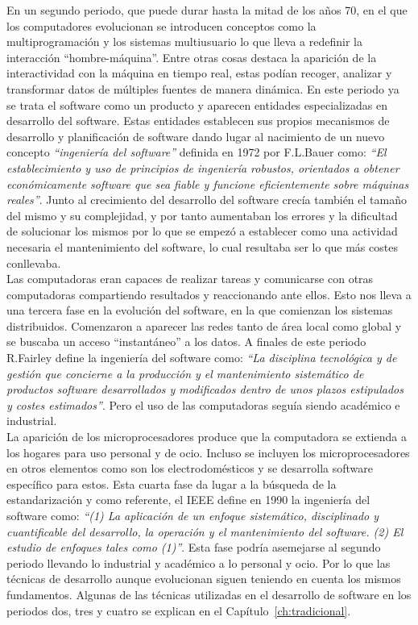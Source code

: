 En un segundo periodo, que puede durar hasta la mitad de los años 70,
en el que los computadores evolucionan se introducen conceptos como la
multiprogramación y los sistemas multiusuario lo que lleva a redefinir
la interacción ``hombre-máquina''. Entre otras cosas destaca la
aparición de la interactividad con la máquina en tiempo real, estas
podían recoger, analizar y transformar datos de múltiples fuentes de
manera dinámica. En este periodo ya se trata el software como un
producto y aparecen entidades especializadas en desarrollo del
software. Estas entidades establecen sus propios mecanismos de
desarrollo y planificación de software dando lugar al nacimiento de un
nuevo concepto \emph{``ingenier\'ia del software''} definida en 1972 por
F.L.Bauer como: \emph{``El establecimiento y uso de principios de ingeniería
robustos, orientados a obtener económicamente software que sea fiable
y funcione eficientemente sobre máquinas reales''}. Junto al crecimiento
del desarrollo del software crecía también el tamaño del mismo y su
complejidad, y por tanto aumentaban los errores y la dificultad de
solucionar los mismos por lo que se empezó a establecer como una
actividad necesaria el mantenimiento del software, lo cual resultaba
ser lo que más costes conllevaba.\\

Las computadoras eran capaces de realizar tareas y comunicarse con
otras computadoras compartiendo resultados y reaccionando ante
ellos. Esto nos lleva a una tercera fase en la evolución del software,
en la que comienzan los sistemas distribuidos. Comenzaron a aparecer
las redes tanto de área local como global y se buscaba un acceso
``instantáneo'' a los datos. A finales de este periodo R.Fairley define
la ingeniería del software como: \emph{``La disciplina tecnológica y de
gestión que concierne a la producción y el mantenimiento sistemático
de productos software desarrollados y modificados dentro de unos
plazos estipulados y costes estimados''}. Pero el uso de las
computadoras seguía siendo académico e industrial.\\

La aparición de los microprocesadores produce que la computadora se
extienda a los hogares para uso personal y de ocio. Incluso se
incluyen los microprocesadores en otros elementos como son los
electrodomésticos y se desarrolla software específico para estos. Esta
cuarta fase da lugar a la búsqueda de la estandarización y como
referente, el IEEE define en 1990 la ingeniería del software como:
\emph{``(1) La aplicación de un enfoque sistemático, disciplinado y
  cuantificable del desarrollo, la operación y el mantenimiento del
  software. (2) El estudio de enfoques tales como (1)''}. Esta fase
podría asemejarse al segundo periodo llevando lo industrial y
académico a lo personal y ocio. Por lo que las técnicas de desarrollo
aunque evolucionan siguen teniendo en cuenta los mismos
fundamentos. Algunas de las técnicas utilizadas en el desarrollo de
software en los
periodos dos, tres y cuatro se explican en el Capítulo~\ref{ch:tradicional}.\\

